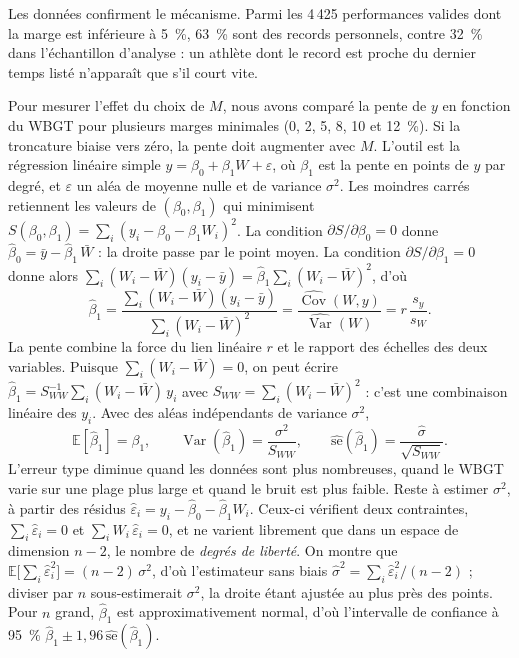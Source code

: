 \documentclass[11pt,a4paper]{article}
\newcommand{\E}{\mathbb{E}}
\DeclareMathOperator{\Var}{Var}
\DeclareMathOperator{\Cov}{Cov}
\begin{document}
Les données confirment le mécanisme. Parmi les 4\,425 performances valides dont la marge est inférieure à 5~\%, 63~\%
sont des records personnels, contre 32~\% dans l'échantillon d'analyse : un athlète dont le record est proche du
dernier temps listé n'apparaît que s'il court vite.

Pour mesurer l'effet du choix de $M$, nous avons comparé la pente de $y$ en fonction du WBGT pour plusieurs marges
minimales (0, 2, 5, 8, 10 et 12~\%). Si la troncature biaise vers zéro, la pente doit augmenter avec $M$. L'outil est
la régression linéaire simple $y = \beta_0 + \beta_1 W + \varepsilon$, où $\beta_1$ est la pente en points de $y$
par degré, et $\varepsilon$ un aléa de moyenne nulle et de variance $\sigma^2$. Les moindres carrés retiennent les
valeurs de $(\beta_0, \beta_1)$ qui minimisent $S(\beta_0, \beta_1) = \sum_i (y_i - \beta_0 - \beta_1 W_i)^2$. La
condition $\partial S/\partial \beta_0 = 0$ donne $\hat\beta_0 = \bar y - \hat\beta_1\,\bar W$ : la droite passe par
le point moyen. La condition $\partial S/\partial \beta_1 = 0$ donne alors
$\sum_i (W_i - \bar W)(y_i - \bar y) = \hat\beta_1\sum_i (W_i - \bar W)^2$, d'où
\[
\hat\beta_1 = \frac{\sum_i (W_i - \bar W)(y_i - \bar y)}{\sum_i (W_i - \bar W)^2}
= \frac{\widehat{\Cov}(W, y)}{\widehat{\Var}(W)} = r\,\frac{s_y}{s_W} .
\]
La pente combine la force du lien linéaire $r$ et le rapport des échelles des deux variables. Puisque
$\sum_i (W_i - \bar W) = 0$, on peut écrire $\hat\beta_1 = S_{WW}^{-1}\sum_i (W_i - \bar W)\,y_i$ avec
$S_{WW} = \sum_i (W_i - \bar W)^2$ : c'est une combinaison linéaire des $y_i$. Avec des aléas indépendants de
variance $\sigma^2$,
\[
\E[\hat\beta_1] = \beta_1, \qquad \Var(\hat\beta_1) = \frac{\sigma^2}{S_{WW}}, \qquad
\widehat{\mathrm{se}}(\hat\beta_1) = \frac{\hat\sigma}{\sqrt{S_{WW}}} .
\]
L'erreur type diminue quand les données sont plus nombreuses, quand le WBGT varie sur une plage plus large et quand
le bruit est plus faible. Reste à estimer $\sigma^2$, à partir des résidus $\hat\varepsilon_i = y_i - \hat\beta_0 -
\hat\beta_1 W_i$. Ceux-ci vérifient deux contraintes, $\sum_i \hat\varepsilon_i = 0$ et
$\sum_i W_i\,\hat\varepsilon_i = 0$, et ne varient librement que dans un espace de dimension $n - 2$, le nombre de
\emph{degrés de liberté}. On montre que $\E\big[\sum_i \hat\varepsilon_i^2\big] = (n - 2)\,\sigma^2$, d'où
l'estimateur sans biais $\hat\sigma^2 = \sum_i \hat\varepsilon_i^2/(n - 2)$ ; diviser par $n$ sous-estimerait
$\sigma^2$, la droite étant ajustée au plus près des points. Pour $n$ grand, $\hat\beta_1$ est approximativement
normal, d'où l'intervalle de confiance à 95~\% $\hat\beta_1 \pm 1{,}96\,\widehat{\mathrm{se}}(\hat\beta_1)$.
\end{document}
